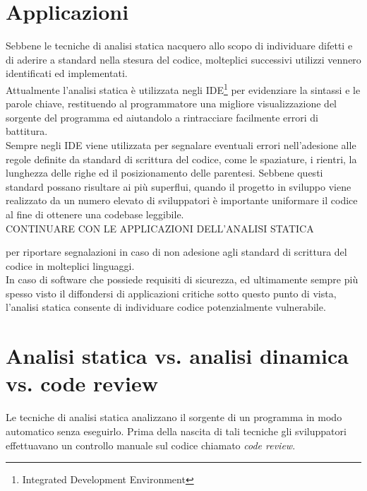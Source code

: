 \section{Applicazioni}
Sebbene le tecniche di analisi statica nacquero allo scopo di individuare difetti e di aderire a standard nella stesura del codice, molteplici successivi utilizzi vennero identificati ed implementati. \\
Attualmente l'analisi statica è utilizzata negli IDE\footnote{Integrated Development Environment} per evidenziare la sintassi e le parole chiave, restituendo al programmatore una migliore visualizzazione del sorgente del programma ed aiutandolo a rintracciare facilmente errori di battitura.\\
Sempre negli IDE viene utilizzata per segnalare eventuali errori nell'adesione alle regole definite da standard di scrittura del codice, come le spaziature, i rientri, la lunghezza delle righe ed il posizionamento delle parentesi. Sebbene questi standard possano risultare ai più superflui, quando il progetto in sviluppo viene realizzato da un numero elevato di sviluppatori è importante uniformare il codice al fine di ottenere una codebase leggibile.\\

CONTINUARE CON LE APPLICAZIONI DELL'ANALISI STATICA

  per riportare segnalazioni in caso di non adesione agli standard di scrittura del codice in molteplici linguaggi.\\
In caso di software che possiede requisiti di sicurezza, ed ultimamente sempre più spesso visto il diffondersi di applicazioni critiche sotto questo punto di vista, l'analisi statica consente di individuare codice potenzialmente vulnerabile.

\section{Analisi statica vs. analisi dinamica vs. code review}
Le tecniche di analisi statica analizzano il sorgente di un programma in modo automatico senza eseguirlo. Prima della nascita di tali tecniche gli sviluppatori effettuavano un controllo manuale sul codice chiamato \emph{code review}.\\

